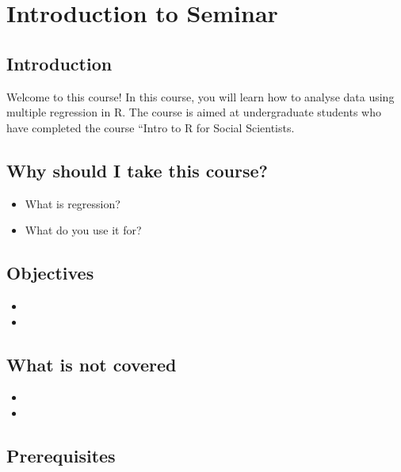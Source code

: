 \documentclass[
]{book}
\providecommand{\tightlist}{%
  \setlength{\itemsep}{0pt}\setlength{\parskip}{0pt}}
\begin{document}
\hypertarget{intro-sem}{%
\chapter{Introduction to Seminar}\label{intro-sem}}

\hypertarget{introduction}{%
\section{Introduction}\label{introduction}}

Welcome to this course! In this course, you will learn how to analyse data using multiple regression in R. The course is aimed at undergraduate students who have completed the course ``Intro to R for Social Scientists.

\hypertarget{why-should-i-take-this-course}{%
\section{Why should I take this course?}\label{why-should-i-take-this-course}}

\begin{itemize}
\tightlist
\item
  What is regression?
\item
  What do you use it for?
\end{itemize}

\hypertarget{objectives}{%
\section{Objectives}\label{objectives}}

\begin{itemize}
\tightlist
\item
\item
\end{itemize}

\hypertarget{what-is-not-covered}{%
\section{What is not covered}\label{what-is-not-covered}}

\begin{itemize}
\tightlist
\item
\item
\end{itemize}

\hypertarget{prerequisites}{%
\section{Prerequisites}\label{prerequisites}}
\end{document}
